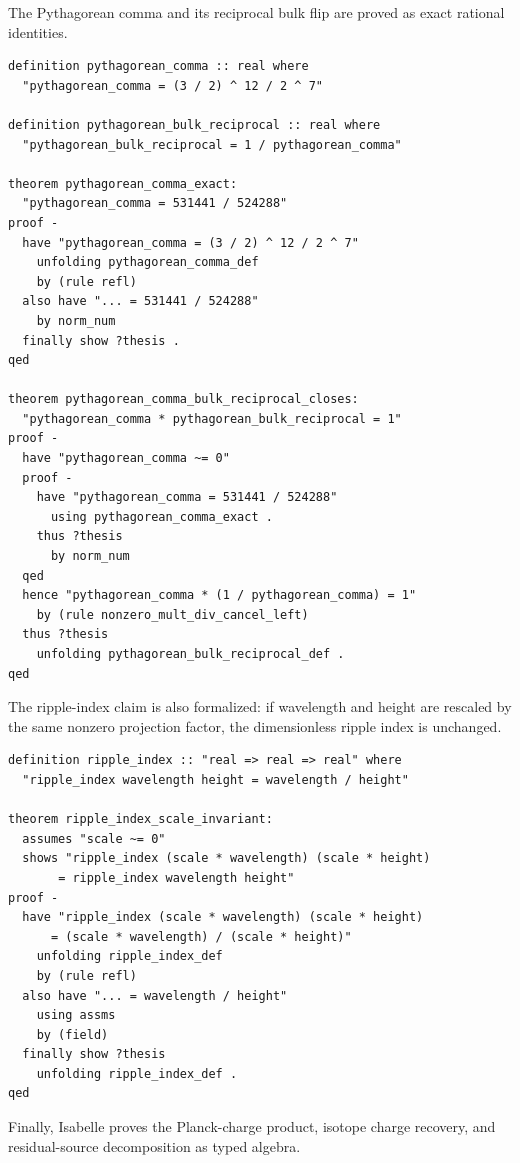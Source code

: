 \documentclass[11pt,a4paper]{article}
\begin{document}
The Pythagorean comma and its reciprocal bulk flip are proved as exact rational identities.

\begin{lstlisting}
definition pythagorean_comma :: real where
  "pythagorean_comma = (3 / 2) ^ 12 / 2 ^ 7"

definition pythagorean_bulk_reciprocal :: real where
  "pythagorean_bulk_reciprocal = 1 / pythagorean_comma"

theorem pythagorean_comma_exact:
  "pythagorean_comma = 531441 / 524288"
proof -
  have "pythagorean_comma = (3 / 2) ^ 12 / 2 ^ 7"
    unfolding pythagorean_comma_def
    by (rule refl)
  also have "... = 531441 / 524288"
    by norm_num
  finally show ?thesis .
qed

theorem pythagorean_comma_bulk_reciprocal_closes:
  "pythagorean_comma * pythagorean_bulk_reciprocal = 1"
proof -
  have "pythagorean_comma ~= 0"
  proof -
    have "pythagorean_comma = 531441 / 524288"
      using pythagorean_comma_exact .
    thus ?thesis
      by norm_num
  qed
  hence "pythagorean_comma * (1 / pythagorean_comma) = 1"
    by (rule nonzero_mult_div_cancel_left)
  thus ?thesis
    unfolding pythagorean_bulk_reciprocal_def .
qed
\end{lstlisting}

The ripple-index claim is also formalized: if wavelength and height are rescaled by the same nonzero projection factor, the dimensionless ripple index is unchanged.

\begin{lstlisting}
definition ripple_index :: "real => real => real" where
  "ripple_index wavelength height = wavelength / height"

theorem ripple_index_scale_invariant:
  assumes "scale ~= 0"
  shows "ripple_index (scale * wavelength) (scale * height)
       = ripple_index wavelength height"
proof -
  have "ripple_index (scale * wavelength) (scale * height)
      = (scale * wavelength) / (scale * height)"
    unfolding ripple_index_def
    by (rule refl)
  also have "... = wavelength / height"
    using assms
    by (field)
  finally show ?thesis
    unfolding ripple_index_def .
qed
\end{lstlisting}

Finally, Isabelle proves the Planck-charge product, isotope charge recovery, and residual-source decomposition as typed algebra.
\end{document}
